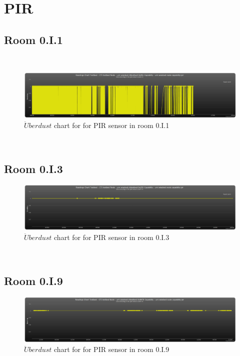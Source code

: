 \documentclass[12pt,a4paper,draft]{report}
\begin{document}
\section{PIR}
%
\subsection{Room 0.I.1}
%
\ \\
\begin{figure}[H]
\centering
	\includegraphics*[scale=0.3]{pir_1}
	\caption{$\ddot{U}berdust$ chart for for PIR sensor in room 0.I.1}
	\label{chart_pir_1}
\end{figure}
\ \\
%
\subsection{Room 0.I.3}
%
\begin{figure}[H]
\centering
	\includegraphics*[scale=0.3]{pir_3}
	\caption{$\ddot{U}berdust$ chart for for PIR sensor in room 0.I.3}
	\label{chart_pir_3}
\end{figure}
\ \\
%
\subsection{Room 0.I.9}
%
\begin{figure}[H]
\centering
	\includegraphics*[scale=0.3]{pir_9}
	\caption{$\ddot{U}berdust$ chart for for PIR sensor in room 0.I.9}
	\label{chart_pir_9}
\end{figure}
\ \\
%
\end{document}
